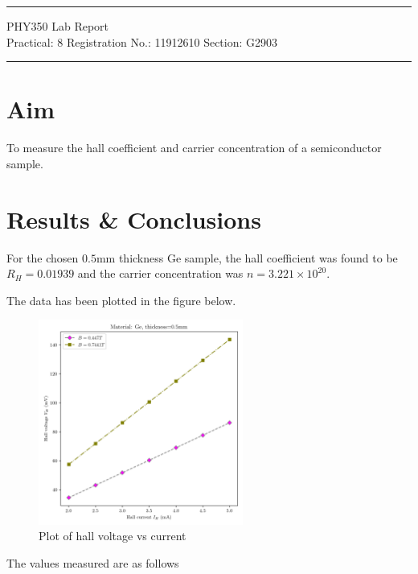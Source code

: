 \documentclass{article}
\begin{document}
	
	\author{Aayush Arya}
	\date{(Submitted: \today)}
	\title{}
	
	\maketitle
	
	\hrule
	\begin{center}
		PHY350 Lab Report\\
		Practical: 8 \quad Registration No.: 11912610 \quad Section: G2903
	\end{center}
	\hrule
	
	\section*{Aim}
	To measure the hall coefficient and carrier concentration of a semiconductor sample.
	
	\section*{Results \& Conclusions}
	
	For the chosen $0.5$mm thickness Ge sample, the hall coefficient was found to be $R_H=0.01939$ and the carrier concentration was $n = 3.221 \times 10^{20}$.
	
	The data has been plotted in the figure below.
	
	\begin{figure}[!h]
		\centering
		\includegraphics[width=0.6\textwidth]{hall_effect}
		\caption{Plot of hall voltage vs current}
	\end{figure}

	The values measured are as follows
\end{document}
